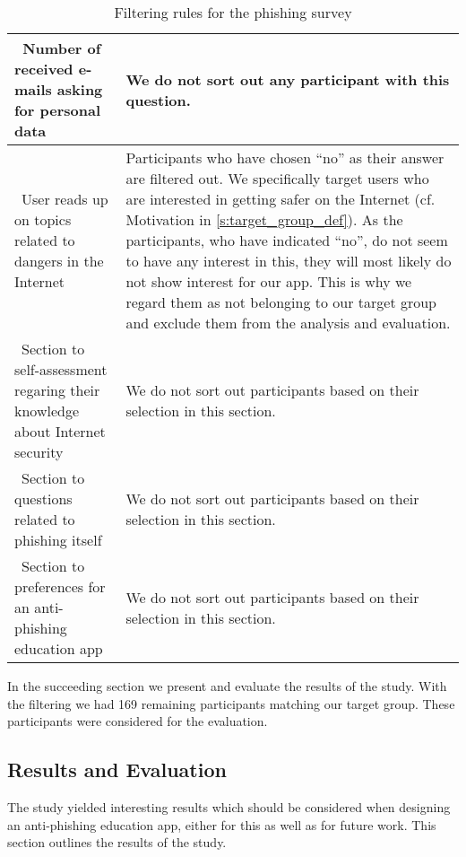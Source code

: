 \begin{table}[hHtbp]
\begin{tabular}{ | p{4.5cm} | p{10cm} |}
 \\
    \hline\ Number of received e-mails asking for personal data  & We do not sort out any participant with this question.
 \\
    \hline\ User reads up on topics related to dangers in the Internet  &  Participants who have chosen ``no'' as their answer are filtered out.
 We specifically target users who are interested in getting safer on the Internet (cf. Motivation in \autoref{s:target_group_def}).
 As the participants, who have indicated ``no'', do not seem to have any interest in this, they will most likely do not show interest for our app.
This is why we regard them as not belonging to our target group and exclude them from the analysis and evaluation.
\\
    \hline\  Section to self-assessment regaring their knowledge about Internet security &  We do not sort out participants based on their selection in this section.
\\
		\hline\  Section to questions related to phishing itself & We do not sort out participants based on their selection in this section.
 \\
    \hline\  Section to preferences for an anti-phishing education app & We do not sort out participants based on their selection in this section.
\\
    \hline
    \end{tabular}
    \caption{Filtering rules for the phishing survey}
    \label{table:prestudy_filter}
    
\end{table}

In the succeeding section we present and evaluate the results of the study.
 With the filtering we had 169 remaining participants matching our target group.
These participants were considered for the evaluation.

\subsection{Results and Evaluation}
\label{s:survey_results}
The study yielded interesting results which should be considered when designing an anti-phishing education app, either for this as well as for future work.
 This section outlines the results of the study.

